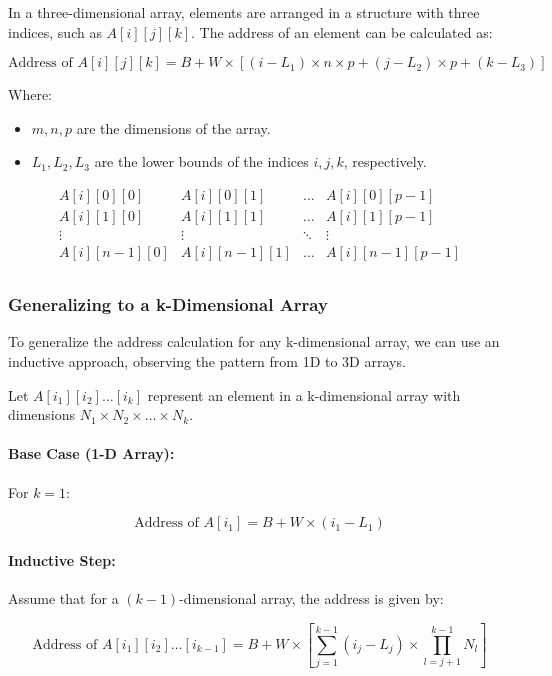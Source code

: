 \documentclass{book}
\begin{document}
In a three-dimensional array, elements are arranged in a structure with three indices, such as \( A[i][j][k] \). The address of an element can be calculated as:

\[
\text{Address of } A[i][j][k] = B + W \times \left[ (i - L_1) \times n \times p + (j - L_2) \times p + (k - L_3) \right]
\]

Where:
\begin{itemize}
	\item \( m, n, p \) are the dimensions of the array.
	\item \( L_1, L_2, L_3 \) are the lower bounds of the indices \( i, j, k \), respectively.
\end{itemize}

\[
\begin{array}{c|c|c|c}
	A[i][0][0] & A[i][0][1] & \dots & A[i][0][p-1] \\
	\hline
	A[i][1][0] & A[i][1][1] & \dots & A[i][1][p-1] \\
	\hline
	\vdots & \vdots & \ddots & \vdots \\
	\hline
	A[i][n-1][0] & A[i][n-1][1] & \dots & A[i][n-1][p-1] \\
\end{array}
\]

\subsubsection{Generalizing to a k-Dimensional Array}

To generalize the address calculation for any k-dimensional array, we can use an inductive approach, observing the pattern from 1D to 3D arrays.

Let \( A[i_1][i_2] \dots [i_k] \) represent an element in a k-dimensional array with dimensions \( N_1 \times N_2 \times \dots \times N_k \).

\paragraph{Base Case (1-D Array):}
For \( k = 1 \):

\[
\text{Address of } A[i_1] = B + W \times (i_1 - L_1)
\]

\paragraph{Inductive Step:}
Assume that for a \( (k-1) \)-dimensional array, the address is given by:

\[
\text{Address of } A[i_1][i_2] \dots [i_{k-1}] = B + W \times \left[ \sum_{j=1}^{k-1} (i_j - L_j) \times \prod_{l=j+1}^{k-1} N_l \right]
\]
\end{document}
